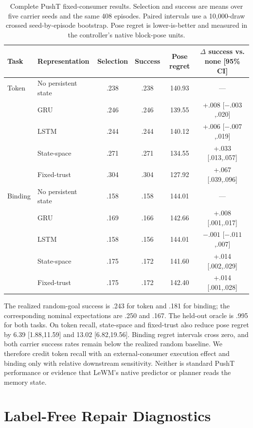 \begin{table}[H]
\centering
\scriptsize
\setlength{\tabcolsep}{3.2pt}
\renewcommand{\arraystretch}{1.07}
\caption{Complete PushT fixed-consumer results. Selection and success are means over five carrier seeds and the same 408 episodes. Paired intervals use a 10,000-draw crossed seed-by-episode bootstrap. Pose regret is lower-is-better and measured in the controller's native block-pose units.}
\begin{tabular}{llcccc}
\toprule
Task & Representation & Selection & Success & Pose regret & $\Delta$ success vs. none [95\% CI] \\
\midrule
Token & No persistent state & .238 & .238 & 140.93 & --- \\
 & GRU & .246 & .246 & 139.55 & +.008 [$-.003$,.020] \\
 & LSTM & .244 & .244 & 140.12 & +.006 [$-.007$,.019] \\
 & State-space & .271 & .271 & 134.55 & +.033 [.013,.057] \\
 & Fixed-trust & .304 & .304 & 127.92 & +.067 [.039,.096] \\
\midrule
Binding & No persistent state & .158 & .158 & 144.01 & --- \\
 & GRU & .169 & .166 & 142.66 & +.008 [.001,.017] \\
 & LSTM & .158 & .156 & 144.01 & $-.001$ [$-.011$,.007] \\
 & State-space & .175 & .172 & 141.60 & +.014 [.002,.029] \\
 & Fixed-trust & .175 & .172 & 142.40 & +.014 [.001,.028] \\
\bottomrule
\end{tabular}
\end{table}

The realized random-goal success is .243 for token and .181 for binding; the corresponding nominal expectations are .250 and .167. The held-out oracle is .995 for both tasks. On token recall, state-space and fixed-trust also reduce pose regret by 6.39 [1.88,11.59] and 13.02 [6.82,19.56]. Binding regret intervals cross zero, and both carrier success rates remain below the realized random baseline. We therefore credit token recall with an external-consumer execution effect and binding only with relative downstream sensitivity. Neither is standard PushT performance or evidence that LeWM's native predictor or planner reads the memory state.

\section{Label-Free Repair Diagnostics}
\label{app:repair}

